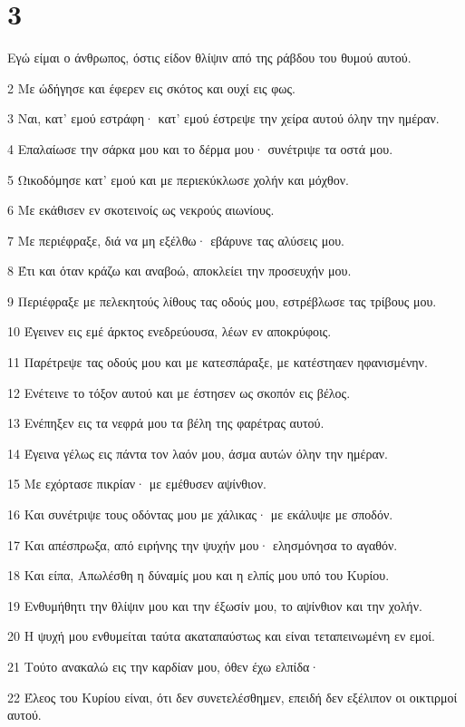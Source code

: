 \chapter{3}

\par Εγώ είμαι ο άνθρωπος, όστις είδον θλίψιν από της ράβδου του θυμού αυτού.
\par 2 Με ώδήγησε και έφερεν εις σκότος και ουχί εις φως.
\par 3 Ναι, κατ' εμού εστράφη· κατ' εμού έστρεψε την χείρα αυτού όλην την ημέραν.
\par 4 Επαλαίωσε την σάρκα μου και το δέρμα μου· συνέτριψε τα οστά μου.
\par 5 Ωικοδόμησε κατ' εμού και με περιεκύκλωσε χολήν και μόχθον.
\par 6 Με εκάθισεν εν σκοτεινοίς ως νεκρούς αιωνίους.
\par 7 Με περιέφραξε, διά να μη εξέλθω· εβάρυνε τας αλύσεις μου.
\par 8 Έτι και όταν κράζω και αναβοώ, αποκλείει την προσευχήν μου.
\par 9 Περιέφραξε με πελεκητούς λίθους τας οδούς μου, εστρέβλωσε τας τρίβους μου.
\par 10 Έγεινεν εις εμέ άρκτος ενεδρεύουσα, λέων εν αποκρύφοις.
\par 11 Παρέτρεψε τας οδούς μου και με κατεσπάραξε, με κατέστηαεν ηφανισμένην.
\par 12 Ενέτεινε το τόξον αυτού και με έστησεν ως σκοπόν εις βέλος.
\par 13 Ενέπηξεν εις τα νεφρά μου τα βέλη της φαρέτρας αυτού.
\par 14 Έγεινα γέλως εις πάντα τον λαόν μου, άσμα αυτών όλην την ημέραν.
\par 15 Με εχόρτασε πικρίαν· με εμέθυσεν αψίνθιον.
\par 16 Και συνέτριψε τους οδόντας μου με χάλικας· με εκάλυψε με σποδόν.
\par 17 Και απέσπρωξα, από ειρήνης την ψυχήν μου· ελησμόνησα το αγαθόν.
\par 18 Και είπα, Απωλέσθη η δύναμίς μου και η ελπίς μου υπό του Κυρίου.
\par 19 Ενθυμήθητι την θλίψιν μου και την έξωσίν μου, το αψίνθιον και την χολήν.
\par 20 Η ψυχή μου ενθυμείται ταύτα ακαταπαύστως και είναι τεταπεινωμένη εν εμοί.
\par 21 Τούτο ανακαλώ εις την καρδίαν μου, όθεν έχω ελπίδα·
\par 22 Έλεος του Κυρίου είναι, ότι δεν συνετελέσθημεν, επειδή δεν εξέλιπον οι οικτιρμοί αυτού.
